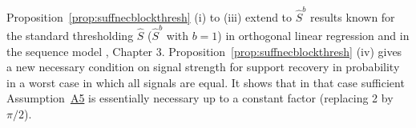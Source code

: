 \documentclass[bj,authoryear]{imsart}
\theoremstyle{plain}
\newtheorem{prop}[thm]{\textsc{Proposition}}
\newcommand{\bs}{\boldsymbol}
\begin{document}
Proposition~\ref{prop:suffnecblockthresh} (i) to (iii) extend to $\hat{S}^{b}$ results known for the standard thresholding $\hat{S}$ ($\hat{S}^b$ with $b=1$) in orthogonal linear regression \citep{ slope, buhlmannvandegeerbook, wainwrighthighdimbook} and in the sequence model \citep{johnstone}, Chapter 3. Proposition~\ref{prop:suffnecblockthresh} (iv) gives a new necessary condition on signal strength for support recovery in probability in a worst case in which all signals are equal. It shows that in that case sufficient Assumption~\hyperlink{lab:A5}{A5} is essentially necessary up to a constant factor (replacing 2 by $\pi/2$).





\end{document}
